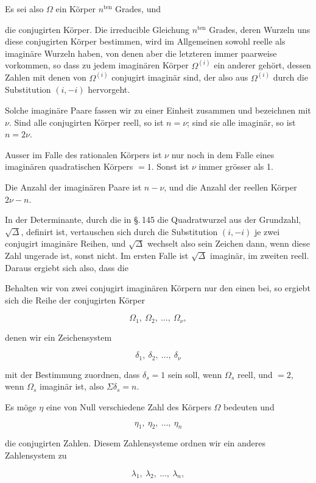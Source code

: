Es sei also $\Omega$ ein Körper $n^{\text{ten}}$ Grades, und


die conjugirten Körper. Die irreducible Gleichung $n^{\text{ten}}$ Grades, deren Wurzeln uns diese conjugirten Körper bestimmen, wird im Allgemeinen sowohl reelle als imaginäre Wurzeln haben, von denen aber die letzteren immer paarweise vorkommen, so dass zu jedem imaginären Körper $\Omega^{(i)}$ ein anderer gehört, dessen Zahlen mit denen von $\Omega^{(i)}$ conjugirt imaginär sind, der also aus $\Omega^{(i)}$ durch die Substitution $(i, -i)$ hervorgeht.

Solche imaginäre Paare fassen wir zu einer Einheit zusammen und bezeichnen  mit $\nu$. Sind alle conjugirten Körper reell, so ist $n = \nu$; sind sie alle imaginär, so ist $n = 2\nu$.

Ausser im Falle des rationalen Körpers ist $\nu$ nur noch in dem Falle eines imaginären quadratischen Körpers $= 1$. Sonst ist $\nu$ immer grösser als 1.

Die Anzahl der imaginären Paare ist $n - \nu$, und die Anzahl der reellen Körper $2\nu - n$.

In der Determinante, durch die in \S.\,145 die Quadratwurzel aus der Grundzahl, $\sqrt{\Delta}$, definirt ist, vertauschen sich durch die Substitution $(i, -i)$ je zwei conjugirt imaginäre Reihen, und $\sqrt{\Delta}$ wechselt also sein Zeichen dann, wenn diese Zahl ungerade ist, sonst nicht. Im ersten Falle ist $\sqrt{\Delta}$ imaginär, im zweiten reell. Daraus ergiebt sich also, dass die 

Behalten wir von zwei conjugirt imaginären Körpern nur den einen bei, so ergiebt sich die Reihe der conjugirten Körper

\[ \Omega_1,\ \Omega_2,\ \ldots,\ \Omega_\nu, \]

denen wir ein Zeichensystem

\[ \delta_1,\ \delta_2,\ \ldots,\ \delta_\nu \]

mit der Bestimmung zuordnen, dass $\delta_s = 1$ sein soll, wenn $\Omega_s$ reell, und $= 2$, wenn $\Omega_s$ imaginär ist, also $\Sigma \delta_s = n$.

Es möge $\eta$ eine von Null verschiedene Zahl des Körpers $\Omega$ bedeuten und

\[ \eta_1,\ \eta_2,\ \ldots,\ \eta_n \]

die conjugirten Zahlen. Diesem Zahlensysteme ordnen wir ein anderes Zahlensystem zu

\[ \lambda_1,\ \lambda_2,\ \ldots,\ \lambda_n, \]
